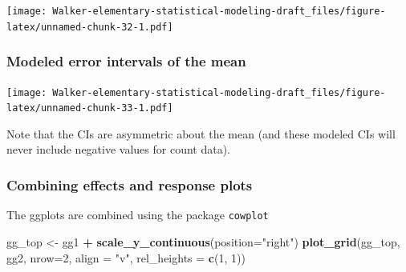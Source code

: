 \documentclass[]{book}
\newenvironment{Shaded}{\begin{snugshade}}{\end{snugshade}}
\newcommand{\KeywordTok}[1]{\textcolor[rgb]{0.13,0.29,0.53}{\textbf{#1}}}
\newcommand{\DataTypeTok}[1]{\textcolor[rgb]{0.13,0.29,0.53}{#1}}
\newcommand{\DecValTok}[1]{\textcolor[rgb]{0.00,0.00,0.81}{#1}}
\newcommand{\FloatTok}[1]{\textcolor[rgb]{0.00,0.00,0.81}{#1}}
\newcommand{\StringTok}[1]{\textcolor[rgb]{0.31,0.60,0.02}{#1}}
\newcommand{\CommentTok}[1]{\textcolor[rgb]{0.56,0.35,0.01}{\textit{#1}}}
\newcommand{\OtherTok}[1]{\textcolor[rgb]{0.56,0.35,0.01}{#1}}
\newcommand{\OperatorTok}[1]{\textcolor[rgb]{0.81,0.36,0.00}{\textbf{#1}}}
\newcommand{\NormalTok}[1]{#1}
\begin{document}
\texttt{[image: Walker-elementary-statistical-modeling-draft\_files/figure-latex/unnamed-chunk-32-1.pdf]}

\subsubsection{Modeled error intervals of the
mean}\label{modeled-error-intervals-of-the-mean}

\begin{Shaded}
\end{Shaded}

\texttt{[image: Walker-elementary-statistical-modeling-draft\_files/figure-latex/unnamed-chunk-33-1.pdf]}

Note that the CIs are asymmetric about the mean (and these modeled CIs
will never include negative values for count data).

\subsubsection{Combining effects and response
plots}\label{combining-effects-and-response-plots}

The ggplots are combined using the package \texttt{cowplot}

\begin{Shaded}
\begin{Highlighting}[]
\NormalTok{gg_top <-}\StringTok{ }\NormalTok{gg1 }\OperatorTok{+}\StringTok{ }\KeywordTok{scale_y_continuous}\NormalTok{(}\DataTypeTok{position=}\StringTok{"right"}\NormalTok{)}
\KeywordTok{plot_grid}\NormalTok{(gg_top, gg2, }\DataTypeTok{nrow=}\DecValTok{2}\NormalTok{, }\DataTypeTok{align =} \StringTok{"v"}\NormalTok{, }\DataTypeTok{rel_heights =} \KeywordTok{c}\NormalTok{(}\DecValTok{1}\NormalTok{, }\DecValTok{1}\NormalTok{))}
\end{Highlighting}
\end{Shaded}
\end{document}
